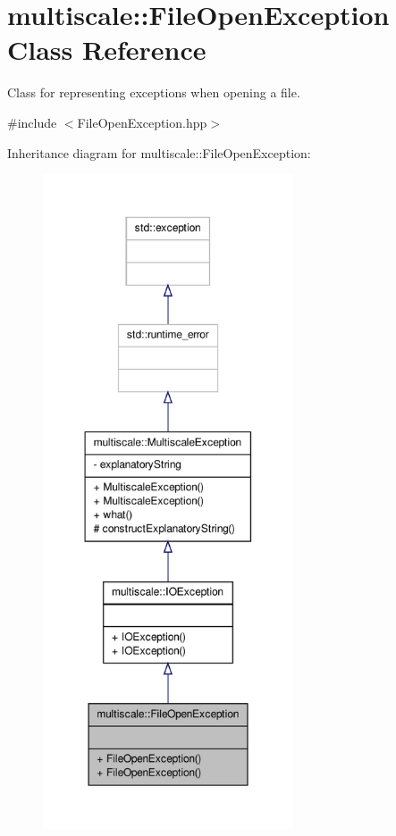 \hypertarget{classmultiscale_1_1FileOpenException}{\section{multiscale\-:\-:File\-Open\-Exception Class Reference}
\label{classmultiscale_1_1FileOpenException}
}


Class for representing exceptions when opening a file.  




{\ttfamily \#include $<$File\-Open\-Exception.\-hpp$>$}



Inheritance diagram for multiscale\-:\-:File\-Open\-Exception\-:\nopagebreak
\begin{figure}[H]
\begin{center}
\leavevmode
\includegraphics[height=550pt]{classmultiscale_1_1FileOpenException__inherit__graph}
\end{center}
\end{figure}


